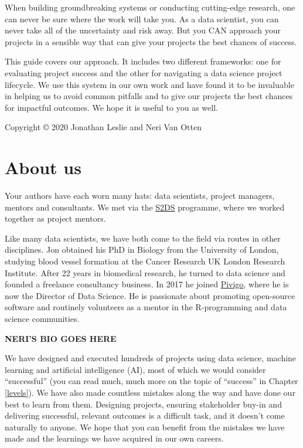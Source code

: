\documentclass[
]{book}
\begin{document}
When building groundbreaking systems or conducting cutting-edge research, one can never be sure where the work will take you. As a data scientist, you can never take all of the uncertainty and risk away. But you CAN approach your projects in a sensible way that can give your projects the best chances of success.

This guide covers our approach. It includes two different frameworks: one for evaluating project success and the other for navigating a data science project lifecycle. We use this system in our own work and have found it to be invaluable in helping us to avoid common pitfalls and to give our projects the best chances for impactful outcomes. We hope it is useful to you as well.

Copyright © 2020 Jonathan Leslie and Neri Van Otten

\hypertarget{about-us}{%
\section*{About us}\label{about-us}}

Your authors have each worn many hats: data scientists, project managers, mentors and consultants. We met via the \href{http://www.s2ds.org/}{S2DS} programme, where we worked together as project mentors.

Like many data scientists, we have both come to the field via routes in other disciplines. Jon obtained his PhD in Biology from the University of London, studying blood vessel formation at the Cancer Research UK London Research Institute. After 22 years in biomedical research, he turned to data science and founded a freelance consultancy business. In 2017 he joined \href{https://www.pivigo.com}{Pivigo}, where he is now the Director of Data Science. He is passionate about promoting open-source software and routinely volunteers as a mentor in the R-programming and data science communities.

\textbf{NERI'S BIO GOES HERE}

We have designed and executed hundreds of projects using data science, machine learning and artificial intelligence (AI), most of which we would consider ``successful'' (you can read much, much more on the topic of ``success'' in Chapter \ref{levels}). We have also made countless mistakes along the way and have done our best to learn from them. Designing projects, ensuring stakeholder buy-in and delivering successful, relevant outcomes is a difficult task, and it doesn't come naturally to anyone. We hope that you can benefit from the mistakes we have made and the learnings we have acquired in our own careers.
\end{document}

